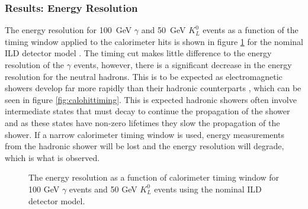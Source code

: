 \subsubsection{Results: Energy Resolution}
The energy resolution for 100~GeV $\gamma$ and 50~GeV $K^{0}_{L}$ events as a function of the timing window applied to the calorimeter hits is shown in figure \ref{fig:ertimingcuts} for the nominal ILD detector model .  The timing cut makes little difference to the energy resolution of the $\gamma$ events, however, there is a significant decrease in the energy resolution for the neutral hadrons.  This is to be expected as electromagnetic showers develop far more rapidly than their hadronic counterparts \cite{Wigmans:2000vf}, which can be seen in figure \ref{fig:calohittiming}.  This is expected hadronic showers often involve intermediate states that must decay to continue the propagation of the shower and as these states have non-zero lifetimes they slow the propagation of the shower.  If a narrow calorimeter timing window is used, energy measurements from the hadronic shower will be lost and the energy resolution will degrade, which is what is observed.  

\begin{figure}[h!]
\caption[The energy resolution as a function of calorimeter timing window for \protect{} 100 GeV $\gamma$ events and \protect{} 50 GeV $K^{0}_{L}$ events using the nominal ILD detector model.]{The energy resolution as a function of calorimeter timing window for \protect{} 100 GeV $\gamma$ events and \protect{} 50 GeV $K^{0}_{L}$ events using the nominal ILD detector model.}
\label{fig:ertimingcuts}
\end{figure}

